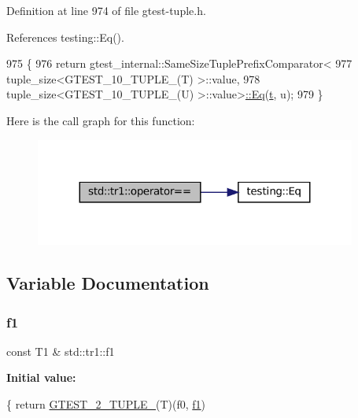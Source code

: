 Definition at line 974 of file gtest-\/tuple.\+h.



References testing\+::\+Eq().


\begin{DoxyCode}
975                                                     \{
976   \textcolor{keywordflow}{return} gtest\_internal::SameSizeTuplePrefixComparator<
977       tuple\_size<GTEST\_10\_TUPLE\_(T) >::value,
978       tuple\_size<GTEST\_10\_TUPLE\_(U) >::value>\hyperlink{namespacetesting_a0cb8ba7eae844c871eccb29e7c81635f}{::Eq}(\hyperlink{namespacebattery__monitor__node_a7a63d20d1ea461e280f4eb5b47f925cd}{t}, u);
979 \}
\end{DoxyCode}
Here is the call graph for this function\+:
\nopagebreak
\begin{figure}[H]
\begin{center}
\leavevmode
\includegraphics[width=299pt]{namespacestd_1_1tr1_af4516de784404381f9b14797694b6311_cgraph}
\end{center}
\end{figure}


\subsection{Variable Documentation}
\mbox{\label{namespacestd_1_1tr1_a9c0fa65b105f8e2f58ba59ecf75fd000}} 
\subsubsection{\texorpdfstring{f1}{f1}}
{\footnotesize\ttfamily const T1 \& std\+::tr1\+::f1}

{\bfseries Initial value\+:}
\begin{DoxyCode}
\{
  \textcolor{keywordflow}{return} \hyperlink{gtest-tuple_8h_a93229c3f009273c73eca237b4d19f326}{GTEST\_2\_TUPLE\_}(T)(f0, \hyperlink{namespacestd_1_1tr1_a9c0fa65b105f8e2f58ba59ecf75fd000}{f1})
\end{DoxyCode}


